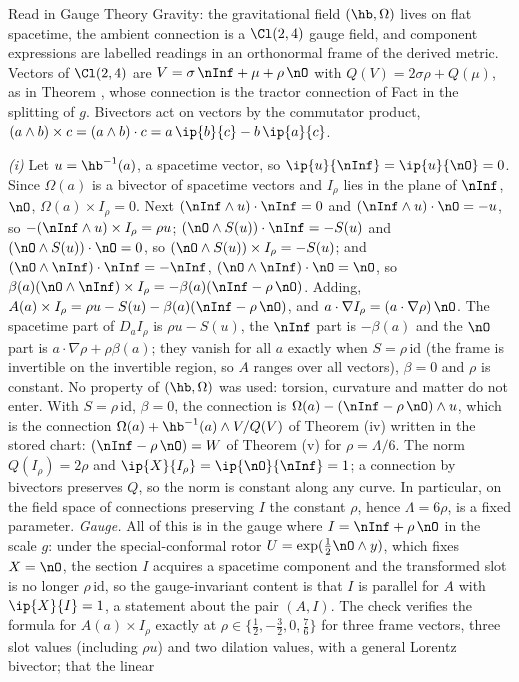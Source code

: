 Read in Gauge Theory Gravity: the gravitational field $(\hb, \Omega)$ lives on flat spacetime, the ambient connection is a $\Cl(2,4)$ gauge field, and component expressions are labelled readings in an orthonormal frame of the derived metric. Vectors of $\Cl(2,4)$ are $V = \sigma\,\nInf + \mu + \rho\,\nO$ with $Q(V) = 2\sigma\rho + Q(\mu)$, as in Theorem , whose connection is the tractor connection of Fact  in the splitting of $g$. Bivectors act on vectors by the commutator product, $(a \wedge b) \times c = (a \wedge b) \cdot c = a\,\ip{b}{c} - b\,\ip{a}{c}$.

\emph{(i)} Let $u = \hb^{-1}(a)$, a spacetime vector, so $\ip{u}{\nInf} = \ip{u}{\nO} = 0$. Since $\Omega(a)$ is a bivector of spacetime vectors and $I_{\rho}$ lies in the plane of $\nInf$, $\nO$, $\Omega(a) \times I_{\rho} = 0$. Next $(\nInf \wedge u) \cdot \nInf = 0$ and $(\nInf \wedge u) \cdot \nO = -u$, so $-(\nInf \wedge u) \times I_{\rho} = \rho u$; $(\nO \wedge S(u)) \cdot \nInf = -S(u)$ and $(\nO \wedge S(u)) \cdot \nO = 0$, so $(\nO \wedge S(u)) \times I_{\rho} = -S(u)$; and $(\nO \wedge \nInf) \cdot \nInf = -\nInf$, $(\nO \wedge \nInf) \cdot \nO = \nO$, so $\beta(a)(\nO \wedge \nInf) \times I_{\rho} = -\beta(a)(\nInf - \rho\,\nO)$. Adding, $A(a) \times I_{\rho} = \rho u - S(u) - \beta(a)(\nInf - \rho\,\nO)$, and $a \cdot \nabla I_{\rho} = (a \cdot \nabla\rho)\,\nO$. The spacetime part of $D_{a}I_{\rho}$ is $\rho u - S(u)$, the $\nInf$ part is $-\beta(a)$ and the $\nO$ part is $a \cdot \nabla\rho + \rho\beta(a)$; they vanish for all $a$ exactly when $S = \rho\,\mathrm{id}$ (the frame is invertible on the invertible region, so $A$ ranges over all vectors), $\beta = 0$ and $\rho$ is constant. No property of $(\hb, \Omega)$ was used: torsion, curvature and matter do not enter. With $S = \rho\,\mathrm{id}$, $\beta = 0$, the connection is $\Omega(a) - (\nInf - \rho\,\nO) \wedge u$, which is the connection $\Omega(a) + \hb^{-1}(a) \wedge V/Q(V)$ of Theorem (iv) written in the stored chart: $(\nInf - \rho\,\nO) = W$ of Theorem (v) for $\rho = \Lambda/6$. The norm $Q(I_{\rho}) = 2\rho$ and $\ip{X}{I_{\rho}} = \ip{\nO}{\nInf} = 1$; a connection by bivectors preserves $Q$, so the norm is constant along any curve. In particular, on the field space of connections preserving $I$ the constant $\rho$, hence $\Lambda = 6\rho$, is a fixed parameter. \emph{Gauge.} All of this is in the gauge where $I = \nInf + \rho\,\nO$ in the scale $g$: under the special-conformal rotor $U = \exp(\tfrac12\nO \wedge y)$, which fixes $X = \nO$, the section $I$ acquires a spacetime component and the transformed slot is no longer $\rho\,\mathrm{id}$, so the gauge-invariant content is that $I$ is parallel for $A$ with $\ip{X}{I} = 1$, a statement about the pair $(A, I)$. The check verifies the formula for $A(a) \times I_{\rho}$ exactly at $\rho \in \{\tfrac12, -\tfrac32, 0, \tfrac76\}$ for three frame vectors, three slot values (including $\rho u$) and two dilation values, with a general Lorentz bivector; that the linear 